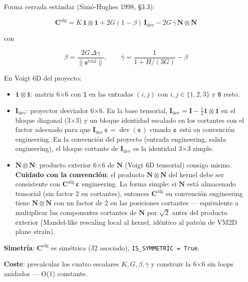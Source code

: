 \documentclass[11pt,letterpaper,oneside]{report}
\begin{document}
Forma cerrada estándar (Simó-Hughes 1998, §3.3):

\[
\mathbf C^\text{alg} = K\,\mathbf 1\otimes\mathbf 1 + 2G(1-\beta)\,\mathbf I_\text{dev} - 2G\,\bar\gamma\,\mathbf N\otimes\mathbf N
\]

con

\[
\beta = \frac{2G\,\Delta\gamma}{\|\mathbf s^\text{trial}\|}, \qquad \bar\gamma = \frac{1}{1 + H/(3G)} - \beta
\]

En Voigt 6D del proyecto:

\begin{itemize}
  \item $\mathbf 1\otimes\mathbf 1$: matriz 6\ensuremath{\times}6 con \texttt{1} en las entradas $(i,j)$ con $i,j \in \{1,2,3\}$ y \texttt{0} resto.
  \item $\mathbf I_\text{dev}$: proyector desviador 6\ensuremath{\times}6. En la base tensorial, $\mathbf I_\text{dev} = \mathbf I - \tfrac{1}{3}\mathbf 1\otimes\mathbf 1$ en el bloque diagonal (3\ensuremath{\times}3) y un bloque identidad escalado en los cortantes con el factor adecuado para que $\mathbf I_\text{dev}\,\boldsymbol\varepsilon = \operatorname{dev}(\boldsymbol\varepsilon)$ cuando $\boldsymbol\varepsilon$ está en convención engineering. En la convención del proyecto (entrada engineering, salida engineering), el bloque cortante de $\mathbf I_\text{dev}$ es la identidad 3\ensuremath{\times}3 simple.
  \item $\mathbf N\otimes\mathbf N$: producto exterior 6\ensuremath{\times}6 de $\mathbf N$ (Voigt 6D tensorial) consigo mismo. \textbf{Cuidado con la convención}: el producto $\mathbf N\otimes\mathbf N$ del kernel debe ser consistente con $\mathbf C^\text{alg}\,\boldsymbol\varepsilon$ engineering. La forma simple: si $\mathbf N$ está almacenado tensorial (sin factor 2 en cortantes), entonces $\mathbf C^\text{alg}$ en convención engineering tiene $\mathbf N\otimes\mathbf N$ con un factor de 2 en las posiciones cortantes --- equivalente a multiplicar las componentes cortantes de $\mathbf N$ por $\sqrt 2$ antes del producto exterior (Mandel-like rescaling local al kernel, idéntico al patrón de VM2D plane strain).
\end{itemize}

\textbf{Simetría}: $\mathbf C^\text{alg}$ es simétrica (J2 asociado), \texttt{IS\_SYMMETRIC = True}.

\textbf{Coste}: precalcular los cuatro escalares $K, G, \beta, \bar\gamma$ y construir la 6\ensuremath{\times}6 sin loops anidados --- O(1) constante.
\end{document}
